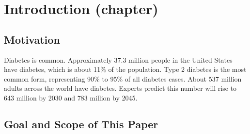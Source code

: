 
\chapter{Introduction (chapter)}
\label{cha:Introduction}

\section{Motivation}
\label{sec:Motivation}
Diabetes is common. Approximately 37.3 million people in the United States have diabetes, which is about 11\% of the population. Type 2 diabetes is the most common 
form, representing 90\% to 95\% of all diabetes cases. About 537 million adults across the world have diabetes. Experts predict this number will rise to 643 million 
by 2030 and 783 million by 2045.\cite{noauthor_information_2023}

\section{Goal and Scope of This Paper}
\label{sec:Goal and Scope of This Paper}
